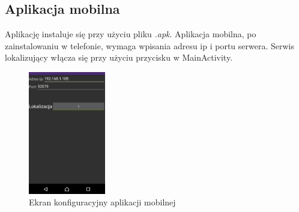 \documentclass{article}
\begin{document}
	\subsection{Aplikacja mobilna}
	
	Aplikację instaluje się przy użyciu pliku \textit{.apk}. Aplikacja mobilna, po zainstalowaniu w telefonie, wymaga wpisania adresu ip i portu serwera. Serwis lokalizujący włącza się przy użyciu przycisku w MainActivity.
	\begin{figure}[H]			
		\centering
		\caption{Ekran konfiguracyjny aplikacji mobilnej}
		\includegraphics[width=0.3\textwidth]{apk_mobilna}
	\end{figure}
\end{document}
